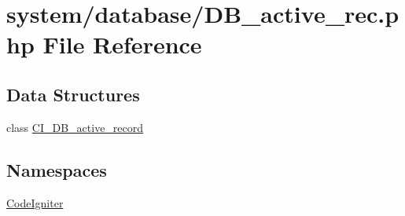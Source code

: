 \hypertarget{_d_b__active__rec_8php}{\section{system/database/\-D\-B\-\_\-active\-\_\-rec.php File Reference}
\label{_d_b__active__rec_8php}
}
\subsection*{Data Structures}
\begin{DoxyCompactItemize}
\item 
class \hyperlink{class_c_i___d_b__active__record}{C\-I\-\_\-\-D\-B\-\_\-active\-\_\-record}
\end{DoxyCompactItemize}
\subsection*{Namespaces}
\begin{DoxyCompactItemize}
\item 
\hyperlink{namespace_code_igniter}{Code\-Igniter}
\end{DoxyCompactItemize}
